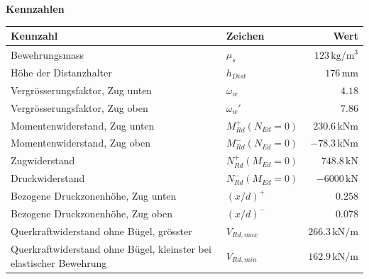 \documentclass[11pt,a4paper]{article}
\begin{document}
\noindent\textbf{Kennzahlen}
\begin{longtable}{llr}
\hline
Kennzahl & Zeichen & Wert \\
\hline
\endhead
Bewehrungsmass & $\mu_s$ & $123\,\mathrm{kg}/\mathrm{m}^{3}$ \\
Höhe der Distanzhalter & $h_{Dist}$ & $176\,\mathrm{mm}$ \\
Vergrösserungsfaktor, Zug unten & $\omega_w$ & $4.18$ \\
Vergrösserungsfaktor, Zug oben & $\omega_w'$ & $7.86$ \\
Momentenwiderstand, Zug unten & $M_{Rd}^{+}(N_{Ed} = 0)$ & $230.6\,\mathrm{kNm}$ \\
Momentenwiderstand, Zug oben & $M_{Rd}^{-}(N_{Ed} = 0)$ & $-78.3\,\mathrm{kNm}$ \\
Zugwiderstand & $N_{Rd}^{+}(M_{Ed} = 0)$ & $748.8\,\mathrm{kN}$ \\
Druckwiderstand & $N_{Rd}^{-}(M_{Ed} = 0)$ & $-6000\,\mathrm{kN}$ \\
Bezogene Druckzonenhöhe, Zug unten & $\left(x/d\right)^{+}$ & $0.258$ \\
Bezogene Druckzonenhöhe, Zug oben & $\left(x/d\right)^{-}$ & $0.078$ \\
Querkraftwiderstand ohne Bügel, grösster & $V_{Rd,max}$ & $266.3\,\mathrm{kN}/\mathrm{m}$ \\
Querkraftwiderstand ohne Bügel, kleinster bei elastischer Bewehrung & $V_{Rd,min}$ & $162.9\,\mathrm{kN}/\mathrm{m}$ \\
\hline
\end{longtable}
\end{document}
